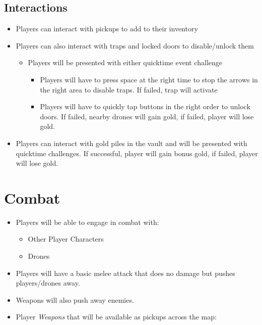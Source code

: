 \documentclass[14pt]{report}
\begin{document}
\subsection{Interactions}
\begin{itemize}
    \item Players can interact with pickups to add to their inventory
    \item Players can also interact with traps and locked doors to disable/unlock them
    \begin{itemize}
        \item Players will be presented with either quicktime event challenge
        \begin{itemize}
            \item Players will have to press space at the right time to stop the arrows in the right area to disable traps. If failed, trap will activate
            \item Players will have to quickly tap buttons in the right order to unlock doors. If failed, nearby drones will gain gold, if failed, player will lose gold.
        \end{itemize}
    \end{itemize}
    \item Players can interact with gold piles in the vault and will be presented with quicktime challenges. If successful, player will gain bonus gold, if failed, player will lose gold.
\end{itemize}

\section{Combat}

\begin{itemize}
    \item Players will be able to engage in combat with:
    \begin{itemize}
        \item Other Player Characters
        \item Drones
    \end{itemize}
    \item Players will have a basic melee attack that does no damage but pushes players/drones away.
    \item Weapons will also push away enemies.
    \item Player \emph{Weapons} that will be available as pickups across the map:
\end{itemize}
\end{document}
